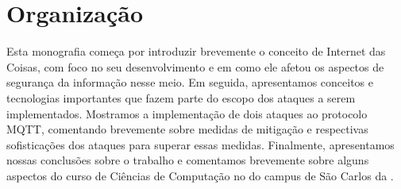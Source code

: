 \section{Organização}

Esta monografia começa por introduzir brevemente o conceito de Internet das Coisas, com foco no seu desenvolvimento e em como ele afetou os aspectos de segurança da informação nesse meio. Em seguida, apresentamos conceitos e tecnologias importantes que fazem parte do escopo dos ataques a serem implementados. Mostramos a implementação de dois ataques ao protocolo MQTT, comentando brevemente sobre medidas de mitigação e respectivas sofisticações dos ataques para superar essas medidas. Finalmente, apresentamos nossas conclusões sobre o trabalho e comentamos brevemente sobre alguns aspectos do curso de Ciências de Computação no  do campus de São Carlos da .

